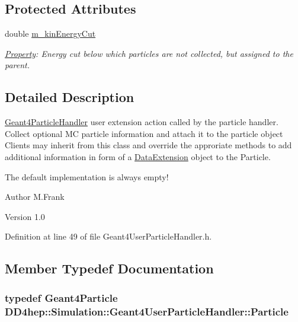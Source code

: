\subsection*{Protected Attributes}
\begin{DoxyCompactItemize}
\item 
double \hyperlink{class_d_d4hep_1_1_simulation_1_1_geant4_user_particle_handler_aaa82abebed535571499c3fa436f86a1b}{m\_\-kinEnergyCut}
\begin{DoxyCompactList}\small\item\em \hyperlink{class_d_d4hep_1_1_property}{Property}: Energy cut below which particles are not collected, but assigned to the parent. \item\end{DoxyCompactList}\end{DoxyCompactItemize}


\subsection{Detailed Description}
\hyperlink{class_d_d4hep_1_1_simulation_1_1_geant4_particle_handler}{Geant4ParticleHandler} user extension action called by the particle handler. Collect optional MC particle information and attach it to the particle object Clients may inherit from this class and override the approriate methods to add additional information in form of a \hyperlink{class_d_d4hep_1_1_simulation_1_1_data_extension}{DataExtension} object to the Particle.

The default implementation is always empty!

\begin{DoxyAuthor}{Author}
M.Frank 
\end{DoxyAuthor}
\begin{DoxyVersion}{Version}
1.0 
\end{DoxyVersion}


Definition at line 49 of file Geant4UserParticleHandler.h.

\subsection{Member Typedef Documentation}
\hypertarget{class_d_d4hep_1_1_simulation_1_1_geant4_user_particle_handler_a0222f326d539ff27c6c446a7a30e8e26}{
\subsubsection[{Particle}]{\setlength{\rightskip}{0pt plus 5cm}typedef {\bf Geant4Particle} {\bf DD4hep::Simulation::Geant4UserParticleHandler::Particle}}}
\label{class_d_d4hep_1_1_simulation_1_1_geant4_user_particle_handler_a0222f326d539ff27c6c446a7a30e8e26}


